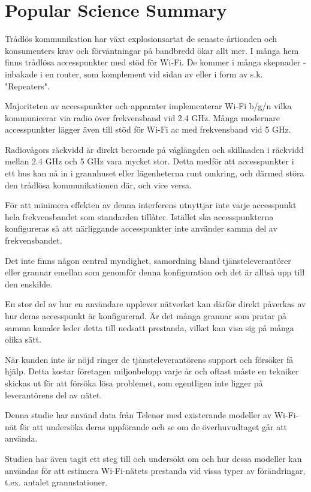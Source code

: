 \chapter*{Popular Science Summary}

Trådlös kommunikation har växt explosionsartat de senaste årtionden och
konsumenters krav och förväntningar på bandbredd ökar allt mer. I många hem
finns trådlösa accesspunkter med stöd för Wi-Fi. De kommer i många skepnader
- inbakade i en router, som komplement vid sidan av eller i form av s.k.
"Repeaters".

Majoriteten av accesspunkter och apparater implementerar Wi-Fi b/g/n vilka kommunicerar via
radio över frekvensband vid 2.4 GHz. Många modernare accesspunkter lägger även
till stöd för Wi-Fi ac med frekvensband vid 5 GHz.

Radiovågors räckvidd är direkt beroende på våglängden och skillnaden i räckvidd
mellan 2.4 GHz och 5 GHz vara mycket stor. Detta medför att accesspunkter i
ett hus kan nå in i grannhuset eller lägenheterna runt omkring, och därmed störa
den trådlösa kommunikationen där, och vice versa.

För att minimera effekten av denna interferens utnyttjar inte varje accesspunkt
hela frekvensbandet som standarden tillåter. Istället ska accesspunkterna
konfigureras så att närliggande accesspunkter inte använder samma del av
frekvensbandet.

Det inte finns någon central myndighet, samordning bland tjänsteleverantörer
eller grannar emellan som genomför denna konfiguration och det är alltså upp
till den enskilde.

En stor del av hur en användare upplever nätverket kan därför direkt påverkas av
hur deras accesspunkt är konfigurerad. Är det många grannar som pratar på samma
kanaler leder detta till nedsatt prestanda, vilket kan visa sig på många olika
sätt.

När kunden inte är nöjd ringer de tjänsteleverantörens support och försöker få
hjälp. Detta kostar företagen miljonbelopp varje år och oftast måste en tekniker
skickas ut för att försöka lösa problemet, som egentligen inte ligger på
leverantörens del av nätet.

Denna studie har använd data från Telenor med existerande modeller av Wi-Fi-nät
för att undersöka deras uppförande och se om de överhuvudtaget går att använda.

Studien har även tagit ett steg till och undersökt om och hur dessa modeller kan
användas för att estimera Wi-Fi-nätets prestanda vid vissa typer av
förändringar, t.ex. antalet grannstationer.
